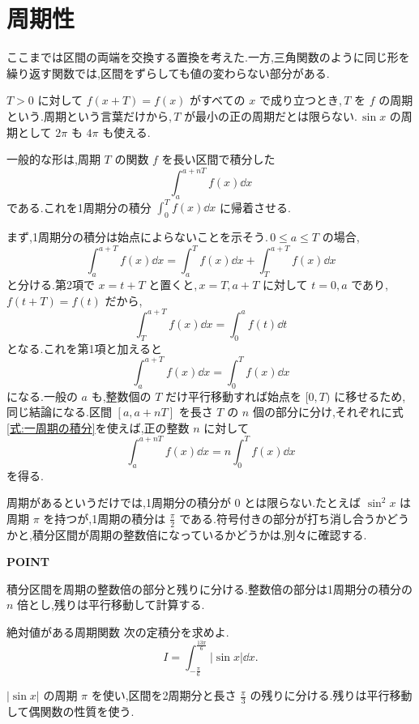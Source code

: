 \section{周期性}\label{節:周期関数の積分}

ここまでは区間の両端を交換する置換を考えた.一方,三角関数のように同じ形を繰り返す関数では,区間をずらしても値の変わらない部分がある.

$T>0$ に対して $f(x+T)=f(x)$ がすべての $x$ で成り立つとき,\,$T$ を $f$ の周期という.周期という言葉だけから,\,$T$ が最小の正の周期だとは限らない.\,$\sin x$ の周期として $2\pi$ も $4\pi$ も使える.

一般的な形は,周期 $T$ の関数 $f$ を長い区間で積分した
\[
\int_a^{a+nT}f(x)\dd x
\]
である.これを1周期分の積分 $\int_0^Tf(x)\dd x$ に帰着させる.

まず,1周期分の積分は始点によらないことを示そう.\,$0\le a\le T$ の場合,
\[
\int_a^{a+T}f(x)\dd x
 =\int_a^T f(x)\dd x+\int_T^{a+T}f(x)\dd x
\]
と分ける.第2項で $x=t+T$ と置くと,\,$x=T,a+T$ に対して $t=0,a$ であり,\,$f(t+T)=f(t)$ だから,
\[
\int_T^{a+T}f(x)\dd x=\int_0^a f(t)\dd t
\]
となる.これを第1項と加えると
\begin{equation}\label{式:一周期の積分}
\int_a^{a+T}f(x)\dd x=\int_0^T f(x)\dd x
\end{equation}
になる.一般の $a$ も,整数個の $T$ だけ平行移動すれば始点を $[0,T)$ に移せるため,同じ結論になる.区間 $[a,a+nT]$ を長さ $T$ の $n$ 個の部分に分け,それぞれに式\eqref{式:一周期の積分}を使えば,正の整数 $n$ に対して
\[
\int_a^{a+nT}f(x)\dd x=n\int_0^T f(x)\dd x
\]
を得る.

周期があるというだけでは,1周期分の積分が $0$ とは限らない.たとえば $\sin^2x$ は周期 $\pi$ を持つが,1周期の積分は $\frac{\pi}{2}$ である.符号付きの部分が打ち消し合うかどうかと,積分区間が周期の整数倍になっているかどうかは,別々に確認する.

\begin{bookpoint}
\textbf{POINT}\par
積分区間を周期の整数倍の部分と残りに分ける.整数倍の部分は1周期分の積分の $n$ 倍とし,残りは平行移動して計算する.
\end{bookpoint}

\begin{example}{絶対値がある周期関数}
次の定積分を求めよ.
\[
I=\int_{-\frac{\pi}{6}}^{\frac{13\pi}{6}}|\sin x|\dd x.
\]
\end{example}

$|\sin x|$ の周期 $\pi$ を使い,区間を2周期分と長さ $\frac{\pi}{3}$ の残りに分ける.残りは平行移動して偶関数の性質を使う.

